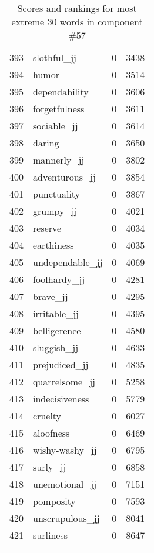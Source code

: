 \begin{longtable}[!htbp]{| rlr@{.}l |}
    393 & slothful\_jj & 0 & 3438 \\
    394 & humor & 0 & 3514 \\
    395 & dependability & 0 & 3606 \\
    396 & forgetfulness & 0 & 3611 \\
    397 & sociable\_jj & 0 & 3614 \\
    398 & daring & 0 & 3650 \\
    399 & mannerly\_jj & 0 & 3802 \\
    400 & adventurous\_jj & 0 & 3854 \\
    401 & punctuality & 0 & 3867 \\
    402 & grumpy\_jj & 0 & 4021 \\
    403 & reserve & 0 & 4034 \\
    404 & earthiness & 0 & 4035 \\
    405 & undependable\_jj & 0 & 4069 \\
    406 & foolhardy\_jj & 0 & 4281 \\
    407 & brave\_jj & 0 & 4295 \\
    408 & irritable\_jj & 0 & 4395 \\
    409 & belligerence & 0 & 4580 \\
    410 & sluggish\_jj & 0 & 4633 \\
    411 & prejudiced\_jj & 0 & 4835 \\
    412 & quarrelsome\_jj & 0 & 5258 \\
    413 & indecisiveness & 0 & 5779 \\
    414 & cruelty & 0 & 6027 \\
    415 & aloofness & 0 & 6469 \\
    416 & wishy-washy\_jj & 0 & 6795 \\
    417 & surly\_jj & 0 & 6858 \\
    418 & unemotional\_jj & 0 & 7151 \\
    419 & pomposity & 0 & 7593 \\
    420 & unscrupulous\_jj & 0 & 8041 \\
    421 & surliness & 0 & 8647 \\
    \hline
    \caption{Scores and rankings for most extreme 30 words in component \#57} \\
\end{longtable}
